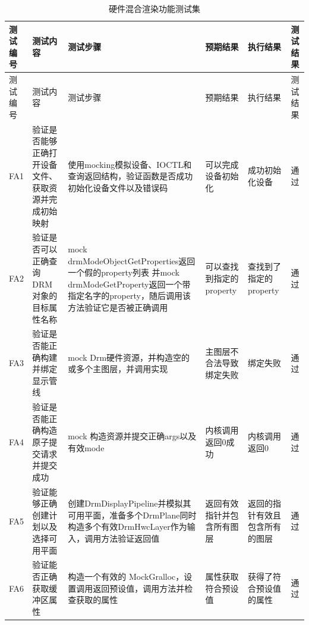   
  
  
  
\begin{longtable}{p{1cm}p{3cm}p{3cm}p{2cm}p{2cm}l}
    \caption{硬件混合渲染功能测试集}\label{tab:硬件混合渲染功能测试集} \\
    \hline
    \makecell[l]{测试\\编号} &  测试内容 & 测试步骤 & 预期结果 & 执行结果 & 测试结果\\
    \hline
    \endfirsthead
    \hline
    \makecell[l]{测试\\编号} &  测试内容 & 测试步骤 & 预期结果 & 执行结果 & 测试结果\\
    \hline
    \endhead
    FA1& 验证是否能够正确打开设备文件、获取资源并完成初始映射 & 使用mocking模拟设备、IOCTL和查询返回结构，验证函数是否成功初始化设备文件以及错误码 & 可以完成设备初始化 & 成功初始化设备 & 通过\\
    FA2 & 验证是否可以正确查询DRM对象的目标属性名称 & mock drmModeObjectGetProperties返回一个假的property列表
    并mock drmModeGetProperty返回一个带指定名字的property，随后调用该方法验证它是否被正确调用 & 可以查找到指定的property & 查找到了指定的property & 通过\\
    FA3 & 验证是否能正确构建并绑定显示管线 & mock Drm硬件资源，并构造空的或多个主图层，并调用实现 & 主图层不合法导致绑定失败 & 绑定失败 & 通过\\
    FA4 & 验证是否能正确构造原子提交请求并提交成功  & mock 构造资源并提交正确args以及有效mode & 内核调用返回0成功 & 内核调用返回0 & 通过\\
    FA5 & 验证能够正确创建计划以及选择可用平面 & 创建DrmDisplayPipeline并模拟其可用平面，准备多个DrmPlane同时构造多个有效DrmHwcLayer作为输入，调用方法验证返回值 & 
    返回有效指针并包含所有图层 & 返回的指针有效且包含所有的图层  & 通过\\
    FA6 & 验证能否正确获取缓冲区属性 & 构造一个有效的 MockGralloc，设置调用返回预设值，调用方法并检查获取的属性 & 属性获取符合预设值 & 获得了符合预设值的属性  & 通过\\
    \hline
\end{longtable}


